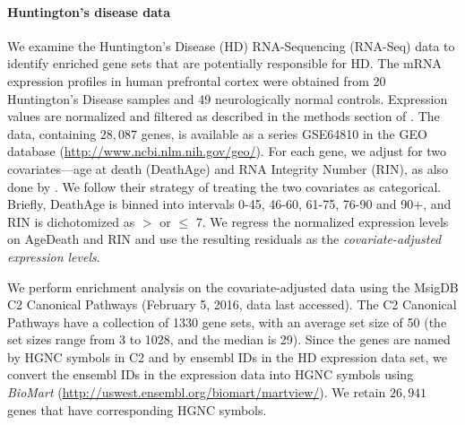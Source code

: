 	\paragraph{Huntington's disease data}
	
	We examine the Huntington's Disease (HD) RNA-Sequencing (RNA-Seq) data 
	\citep{labadorf2015rna} to identify enriched gene sets that are potentially responsible for HD. 
	The mRNA expression profiles in human prefrontal cortex were obtained from 20 Huntington's 
	Disease samples and 49 neurologically normal controls.  Expression values are normalized and 
	filtered as described in the methods section of \citet{labadorf2015rna}. The data, containing 
	$28,087$ genes, is available as a series GSE64810 in the GEO database 
	(\url{http://www.ncbi.nlm.nih.gov/geo/}). For each gene, we adjust for two covariates---age at 
	death (DeathAge) and RNA Integrity Number (RIN), as also done by \citet{labadorf2015rna}. We 
	follow their strategy of treating the two covariates as categorical. Briefly, DeathAge is 
	binned into intervals 0-45, 46-60, 61-75, 76-90 and	90+, and RIN is dichotomized as  $>$ or 
	$\leq$ 7. We regress the normalized expression levels on AgeDeath and RIN and use the resulting 
	residuals as the \textit{covariate-adjusted expression levels}.
	
	We perform enrichment analysis on the covariate-adjusted data using the MsigDB
	\citep{subramanian2005gene} C2 Canonical Pathways (February 5, 2016, data last accessed).
	The C2 Canonical Pathways have a collection of 1330 gene sets, with an average set size of
	50 (the set sizes range from 3 to 1028, and the median is 29). Since the genes are named by
	HGNC symbols in C2 and by ensembl IDs in the HD expression data set, we convert the ensembl 
	IDs in 	the expression data into HGNC symbols using \textit{BioMart}
	(\url{http://uswest.ensembl.org/biomart/martview/}). We retain $26,941$ genes that have
	corresponding HGNC symbols. 
	
	
	
